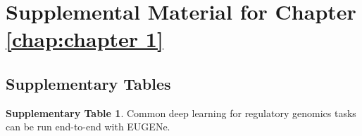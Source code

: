 \appendix{}

\chapter{Supplemental Material for Chapter \ref{chap:chapter 1}}

\section{Supplementary Tables}

\noindent
\textbf{Supplementary Table 1}. Common deep learning for regulatory genomics tasks can be run end-to-end with EUGENe.

